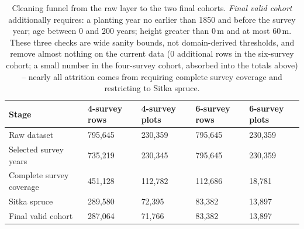 \begin{table}[!htbp]
\centering
\scriptsize
\setlength{\tabcolsep}{3pt}
\renewcommand{\arraystretch}{0.95}
\begin{tabular}{p{4.2cm}p{2.4cm}p{2.4cm}p{2.4cm}p{2.4cm}}
\hline
Stage & 4-survey rows & 4-survey plots & 6-survey rows & 6-survey plots \\
\hline
Raw dataset & 795,645 & 230,359 & 795,645 & 230,359 \\
Selected survey years & 735,219 & 230,345 & 795,645 & 230,359 \\
Complete survey coverage & 451,128 & 112,782 & 112,686 & 18,781 \\
Sitka spruce & 289,580 & 72,395 & 83,382 & 13,897 \\
Final valid cohort & 287,064 & 71,766 & 83,382 & 13,897 \\
\hline
\end{tabular}
\caption{Cleaning funnel from the raw layer to the two final cohorts. \emph{Final valid cohort}
additionally requires: a planting year no earlier than 1850 and before the survey year; age
between 0 and 200 years; height greater than 0\,m and at most 60\,m. These three checks are wide
sanity bounds, not domain-derived thresholds, and remove almost nothing on the current data (0
additional rows in the six-survey cohort; a small number in the four-survey cohort, absorbed into
the totals above) -- nearly all attrition comes from requiring complete survey coverage and
restricting to Sitka spruce.}
\label{tab:data-funnel}
\end{table}

